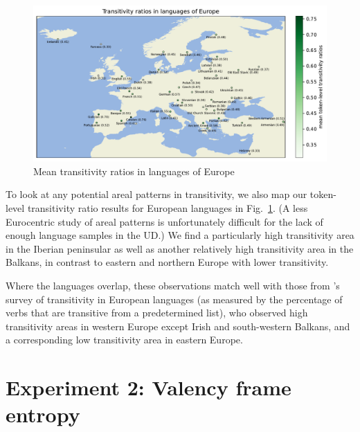 \begin{figure}
  \centering
  \includegraphics[width=\textwidth]{figures/transitivity_europe.pdf}
  \caption{Mean transitivity ratios in languages of Europe}
  \label{fig:transitivity_europe}
\end{figure}

To look at any potential areal patterns in transitivity, we also map our token-level transitivity ratio results for European languages in Fig.~\ref{fig:transitivity_europe}. (A less Eurocentric study of areal patterns is unfortunately difficult for the lack of enough language samples in the UD.) We find a particularly high transitivity area in the Iberian peninsular as well as another relatively high transitivity area in the Balkans, in contrast to eastern and northern Europe with lower transitivity.

Where the languages overlap, these observations match well with those from \citet{say2014}'s survey of transitivity in European languages (as measured by the percentage of verbs that are transitive from a predetermined list), who observed high transitivity areas in western Europe except Irish and south-western Balkans, and a corresponding low transitivity area in eastern Europe.




\section{Experiment 2: Valency frame entropy}
